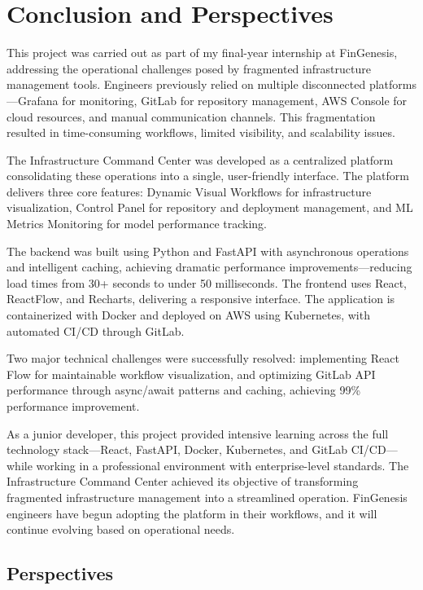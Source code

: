 \chapter*{Conclusion and Perspectives}

This project was carried out as part of my final-year internship at FinGenesis, addressing the operational challenges posed by fragmented infrastructure management tools. Engineers previously relied on multiple disconnected platforms—Grafana for monitoring, GitLab for repository management, AWS Console for cloud resources, and manual communication channels. This fragmentation resulted in time-consuming workflows, limited visibility, and scalability issues.

The Infrastructure Command Center was developed as a centralized platform consolidating these operations into a single, user-friendly interface. The platform delivers three core features: Dynamic Visual Workflows for infrastructure visualization, Control Panel for repository and deployment management, and ML Metrics Monitoring for model performance tracking.

The backend was built using Python and FastAPI with asynchronous operations and intelligent caching, achieving dramatic performance improvements—reducing load times from 30+ seconds to under 50 milliseconds. The frontend uses React, ReactFlow, and Recharts, delivering a responsive interface. The application is containerized with Docker and deployed on AWS using Kubernetes, with automated CI/CD through GitLab.

Two major technical challenges were successfully resolved: implementing React Flow for maintainable workflow visualization, and optimizing GitLab API performance through async/await patterns and caching, achieving 99\% performance improvement.

As a junior developer, this project provided intensive learning across the full technology stack—React, FastAPI, Docker, Kubernetes, and GitLab CI/CD—while working in a professional environment with enterprise-level standards. The Infrastructure Command Center achieved its objective of transforming fragmented infrastructure management into a streamlined operation. FinGenesis engineers have begun adopting the platform in their workflows, and it will continue evolving based on operational needs.

\section*{Perspectives}

